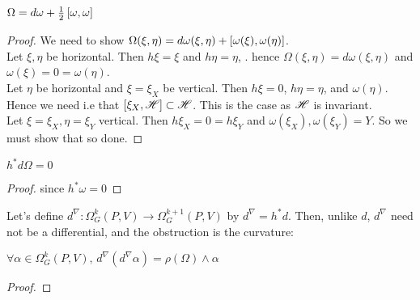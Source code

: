 \documentclass{article}
\begin{document}
\begin{prop}
	$\Omega = d\omega + \frac{1}{2}\comm[\omega]{\omega}$
\end{prop}
\begin{proof}
	We need to show $\Omega(\xi,\eta) = d\omega(\xi,\eta) + \comm[\omega(\xi)]{\omega(\eta)}$. \\
	Let $\xi, \eta$ be horizontal. Then $h\xi = \xi$ and $h\eta =\eta$, . hence $\Omega(\xi,\eta) = d\omega(\xi,\eta)$ and $\omega(\xi) = 0 = \omega(\eta)$. \\
	Let $\eta$ be horizontal and $\xi = \xi_X$ be vertical. Then $h\xi=0$, $h\eta = \eta$, and $\omega(\eta)$. Hence we need 
	i.e that $\comm[\xi_X]{\ms{H}} \subset \ms{H}$. This is the case as $\ms{H}$ is invariant. \\
	Let $\xi=\xi_X, \eta = \xi_Y$ vertical. Then $h\xi_X = 0 = h\xi_Y$ and $\omega(\xi_X), \omega(\xi_Y) = Y$. So we must show that 
	so done. 
\end{proof}

\begin{corollary}
	$h^\ast d\Omega = 0$
\end{corollary}
\begin{proof}
	since $h^\ast \omega = 0$
\end{proof}
Let's define $d^\nabla : \Omega^k_G(P,V) \to \Omega^{k+1}_G(P,V)$ by $d^\nabla = h^\ast d$. Then, unlike $d$, $d^\nabla$ need not be a differential, and the obstruction is the curvature:

\begin{prop}
	$\forall \alpha \in \Omega_G^k(P,V), \, d^\nabla(d^\nabla \alpha) = \rho(\Omega) \wedge \alpha$
\end{prop}
\begin{proof}
\end{proof}
\end{document}
